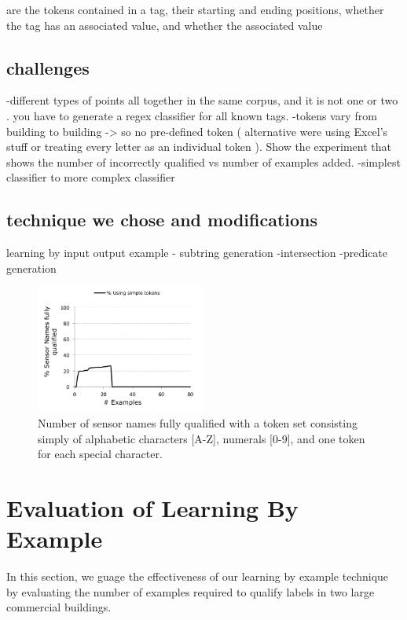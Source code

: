 are the tokens contained in a tag, their starting and ending positions, whether the tag has an associated value, and whether the associated value 

\subsection{challenges}


-different types of points all together in the same corpus, and it is not one or two . you have to generate a regex classifier for all known tags. 
-tokens vary from building to building -> so no pre-defined token ( alternative were using Excel's stuff or treating every letter as an individual token ). Show the experiment that shows the number of incorrectly qualified vs number of examples added.
-simplest classifier to more complex classifier



\subsection{technique we chose and modifications}

learning by input output example
- subtring generation
-intersection
-predicate generation

\begin{figure}[h!]
  
  \centering
    \includegraphics[width=0.5\textwidth]{figs/gulwani-noconverge.pdf}
\caption{Number of sensor names fully qualified with a token set consisting simply of alphabetic characters [A-Z], numerals [0-9], and one token for each special character.}
\label{fig:simpleTokenNoCoverage}
\end{figure}


\section{Evaluation of Learning By Example}

In this section, we guage the effectiveness of our learning by example technique by evaluating the number of examples required to qualify labels in two large commercial buildings. 

